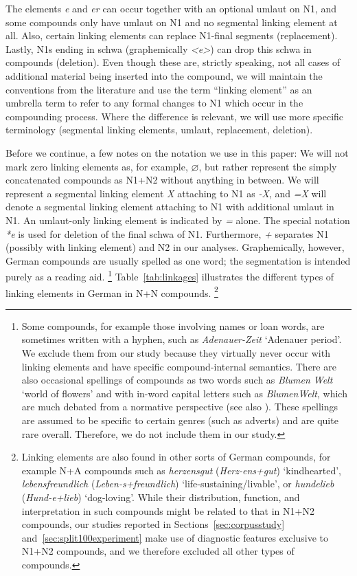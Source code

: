 The elements \textit{e} and \textit{er} can occur together with an optional umlaut on N1, and some compounds only have umlaut on N1 and no segmental linking element at all.
Also, certain linking elements can replace N1-final segments (replacement).
Lastly, N1s ending in schwa (graphemically \textit{<e>}) can drop this schwa in compounds (deletion).
Even though these are, strictly speaking, not all cases of additional material being inserted into the compound, we will maintain the conventions from the literature and use the term ``linking element'' as an umbrella term to refer to any formal changes to N1 which occur in the compounding process.
Where the difference is relevant, we will use more specific terminology (\ie segmental linking elements, umlaut, replacement, deletion).

Before we continue, a few notes on the notation we use in this paper:
We will not mark zero linking elements as, for example, $\varnothing$, but rather represent the simply concatenated compounds as N1+N2 without anything in between.
We will represent a segmental linking element \textit{X} attaching to N1 as \textit{-X}, and \textit{=X} will denote a segmental linking element attaching to N1 with additional umlaut in N1.
An umlaut-only linking element is indicated by \textit{=} alone.
The special notation \textit{*e} is used for deletion of the final schwa of N1.
Furthermore, \textit{+} separates N1 (possibly with linking element) and N2 in our analyses.
Graphemically, however, German compounds are usually spelled as one word; the segmentation is intended purely as a reading aid.%
	\footnote{Some compounds, for example those involving names or loan words, are sometimes written with a hyphen, such as \textit{Adenauer-Zeit} `Adenauer period'.
	We exclude them from our study because they virtually never occur with linking elements and have specific compound-internal semantics.
	There are also occasional spellings of compounds as two words such as \textit{Blumen Welt} `world of flowers' and with in-word capital letters such as \textit{BlumenWelt}, which are much debated from a normative perspective (see also \citealt{Scherer2012}).
	These spellings are assumed to be specific to certain genres (such as adverts) and are quite rare overall.
	Therefore, we do not include them in our study.}
Table~\ref{tab:linkages} illustrates the different types of linking elements in German in N+N compounds.%
	\footnote{Linking elements are also found in other sorts of German compounds, for example N+A compounds such as \textit{herzensgut} (\textit{Herz-ens+gut}) `kindhearted', \textit{lebensfreundlich} (\textit{Leben-s+freundlich}) `life-sustaining\slash livable', or \textit{hundelieb} (\textit{Hund-e+lieb}) `dog-loving'.
	While their distribution, function, and interpretation in such compounds might be related to that in N1+N2 compounds, our studies reported in Sections~\ref{sec:corpusstudy} and~\ref{sec:split100experiment} make use of diagnostic features exclusive to N1+N2 compounds, and we therefore excluded all other types of compounds.}


